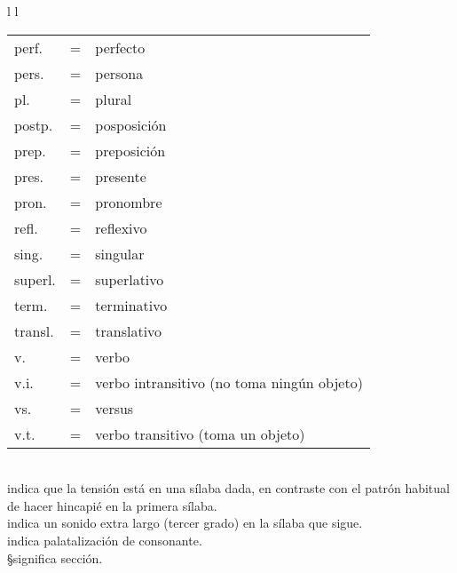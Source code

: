 \begin{tabular}{ l l }
\begin{tabular}{ l c l }
	perf.	& = & perfecto \\
	pers.	& = & persona \\
	pl.		& = & plural \\
	postp.	& = & posposición \\
	prep.	& = & preposición \\
	pres.	& = & presente \\
	pron.	& = & pronombre \\
	refl.	& = & reflexivo \\
	sing.	& = & singular \\
	superl.	& = & superlativo \\
	term.	& = & terminativo \\
	transl.	& = & translativo \\
	v.		& = & verbo \\
	v.i.	& = & verbo intransitivo (no toma ningún objeto) \\
	vs.		& = & versus \\
	v.t.	& = & verbo transitivo (toma un objeto)
	\end{tabular}
\end{tabular}\\[1cm]

\textasciiacute \qquad indica que la tensión está en una sílaba dada, en contraste con el patrón habitual de hacer hincapié en la primera sílaba.\\

\textasciigrave \qquad indica un sonido extra largo (tercer grado) en la sílaba que sigue.\\

\textquotesingle \qquad indica palatalización de consonante.\\

\S \qquad significa sección.